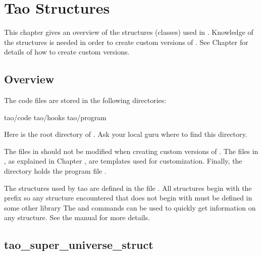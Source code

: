 \chapter{Tao Structures}
\label{c:structures}

This chapter gives an overview of the structures (classes) used in \tao.  Knowledge of the
structures is needed in order to create custom versions of \tao. See Chapter  for
details of how to create custom \tao versions.

\section{Overview}

The \tao code files are stored in the following directories:
\begin{example}
  tao/code
  tao/hooks
  tao/program
\end{example}
Here  is the root directory of \tao. Ask your local guru
where to find this directory.

The files in  should not be modified when creating
custom versions of \tao. The files in , as
explained in Chapter , are templates used
for customization. Finally, the directory  holds
the program file .

The structures used by tao are defined in the file .
All \tao structures begin with the prefix  so any structure
encountered that does not begin with  must be defined in some other library
The  and  commands can be used to quickly get information on
any structure. See the \bmad manual for more details.

\section{tao_super_universe_struct}
\label{s:super.uni.struct}

